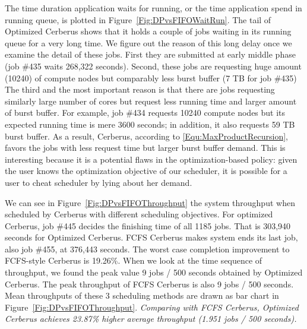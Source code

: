 The time duration application waits for running,
or the time application spend in running queue,
is plotted in Figure~\ref{Fig:DPvsFIFOWaitRun}.
The tail of Optimized Cerberus shows that it holds a couple of jobs waiting
in its running queue for a very long time.
We figure out the reason of this long delay once we examine the detail of these jobs.
First they are submitted at early middle phase (job \#435 waits 268,322 seconds).
Second, these jobs are requesting huge amount (10240) of compute nodes
but comparably less burst buffer (7 TB for job \#435)
The third and the most important reason is that there are jobs requesting similarly
large number of cores but request less running time and larger amount of burst buffer.
For example, job \#434 requests 10240 compute nodes
but its expected running time is mere 3600 seconds;
in addition, it also requests 59 TB burst buffer.
As a result, Cerberus, according to \ref{Equ:MaxProductRecursion},
favors the jobs with less request time but larger burst buffer demand.
This is interesting because it is a potential flaws in the optimization-based policy:
given the user knows the optimization objective of our scheduler,
it is possible for a user to cheat scheduler by lying about her demand.


We can see in Figure~\ref{Fig:DPvsFIFOThroughput} the system throughput
when scheduled by Cerberus with different scheduling objectives.
For optimized Cerberus, job \#445 decides the finishing time of all 1185 jobs.
That is 303,940 seconds for Optimized Cerberus.
FCFS Cerberus makes system ends its last job, also job \#455, at 376,443 seconds.
The worst case completion improvement to FCFS-style Cerberus is 19.26\%.
When we look at the time sequence of throughput,
we found the peak value 9 jobs / 500 seconds obtained by Optimized Cerberus.
The peak throughput of FCFS Cerberus is also 9 jobs / 500 seconds.
Mean throughputs of these 3 scheduling methods are drawn
as bar chart in Figure~\ref{Fig:DPvsFIFOThroughput}.
\textit{Comparing with FCFS Cerberus, Optimized Cerberus achieves
23.87\% higher average throughput (1.951 jobs / 500 seconds).}



